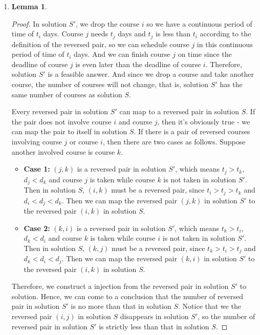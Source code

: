 \documentclass[12pt,a4paper]{article}
\makeatletter
\newtheorem{lemma}[theorem]{Lemma}
\newtheorem*{solution}{Solution}
\theoremstyle{definition}
\renewenvironment{solution}[1][Solution] {\par\pushQED{\qed}\normalfont\topsep6\p@\@plus6\p@\relax\trivlist\item[\hskip\labelsep\bfseries#1\@addpunct{.}]\ignorespaces}{\popQED\endtrivlist\@endpefalse} \makeatother
\makeatother
\begin{document}
\begin{enumerate}
\begin{solution}
\begin{lemma}
        \end{lemma}
        \begin{proof}
        In solution $S'$, we drop the course $i$ so we have a continuous period of time of $t_i$ days. Course $j$ needs $t_j$ days and $t_j$ is less than $t_i$ according to the definition of the reversed pair, so we can schedule course $j$ in this continuous period of time of $t_i$ days. And we can finish course $j$ on time since the deadline of course $j$ is even later than the deadline of course $i$. Therefore, solution $S'$ is a feasible answer. And since we drop a course and take another course, the number of courses will not change, that is, solution $S'$ has the same number of courses as solution $S$.

        Every reversed pair in solution $S'$ can map to a reversed pair in solution $S$. If the pair does not involve course $i$ and course $j$, then it's obviously true - we can map the pair to itself in solution $S$. If there is a pair of reversed courses involving course $j$ or course $i$, then there are two cases as follows. Suppose another involved course is course $k$.
        \begin{itemize}
        \item \textbf{Case 1:} $(j,k)$ is a reversed pair in solution $S'$, which means $t_j > t_k$, $d_j < d_k$ and course $j$ is taken while course $k$ is not taken in solution $S'$. Then in solution $S$, $(i,k)$ must be a reversed pair, since $t_i > t_j > t_k$ and $d_i < d_j < d_k$. Then we can map the reversed pair $(j,k)$ in solution $S'$ to the reversed pair $(i,k)$ in solution $S$.
        \item \textbf{Case 2:} $(k,i)$ is a reversed pair in solution $S'$, which means $t_k > t_i$, $d_k < d_i$ and course $k$ is taken while course $i$ is not taken in solution $S'$. Then in solution $S$, $(k,j)$ must be a reversed pair, since $t_k > t_i > t_j$ and $d_k < d_i < d_j$. Then we can map the reversed pair $(k,i)$ in solution $S'$ to the reversed pair $(i,k)$ in solution $S$.
        \end{itemize}
        Therefore, we construct a injection from the reversed pair in solution $S'$ to solution. Hence, we can come to a conclusion that the number of reversed pair in solution $S'$ is no more than that in solution $S$. Notice that we the reversed pair $(i,j)$ in solution $S$ disappears in solution $S'$, so the number of reversed pair in solution $S'$ is strictly less than that in solution $S$.
        \end{proof}

\end{solution}
\end{enumerate}
\end{document}
